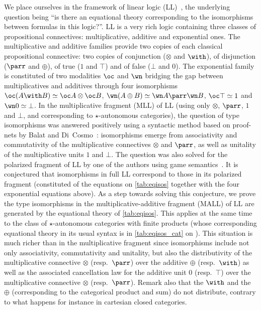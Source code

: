 \documentclass{lmcs}
\newcommand*{\tens}{\otimes} %
\newcommand*{\resp}{resp.}
\newcommand*{\iso}{\mathrel{\simeq}} %
\begin{document}
We place ourselves in the framework of linear logic (LL)~\cite{ll},
the underlying question being ``is there an equational theory corresponding to the isomorphisms between formulas in this logic?''.
LL is a very rich logic containing three classes of propositional connectives: multiplicative, additive and exponential ones.
The multiplicative and additive families provide two copies of each classical propositional connective: two copies of conjunction ($\tens$ and $\with$), of disjunction ($\parr$ and $\oplus$), of true ($1$ and $\top$) and of false ($\bot$ and $0$).
The exponential family is constituted of two modalities $\oc$ and $\wn$ bridging the gap between multiplicatives and additives through four isomorphisms $\oc(A\with B)\iso \oc A\tens\oc B$, $\wn(A\oplus B)\iso \wn A\parr\wn B$, $\oc\top\iso 1$ and $\wn 0\iso\bot$.
In the multiplicative fragment (MLL) of LL (using only $\tens$, $\parr$, $1$ and $\bot$, and corresponding to $\star$-autonomous categories), the question of type isomorphisms was answered positively using a syntactic method based on proof-nets by Balat and Di~Cosmo~\cite{mllisos}: isomorphisms emerge from associativity and commutativity of the multiplicative connectives $\tens$ and $\parr$, as well as unitality of the multiplicative units $1$ and $\bot$.
The question was also solved for the polarized fragment of LL by one of the authors using game semantics~\cite{classisos}.
It is conjectured that isomorphisms in full LL correspond to those in its polarized fragment (constituted of the equations on \autoref{tab:eqisos} together with the four exponential equations above).
As a step towards solving this conjecture, we prove the type isomorphisms in the multiplicative-additive fragment (MALL) of LL are generated by the equational theory of \autoref{tab:eqisos}.
This applies at the same time to the class of $\star$-autonomous categories with finite products (whose corresponding equational theory in its usual syntax is in \autoref{tab:eqisos_cat} on ).
This situation is much richer than in the multiplicative fragment since isomorphisms include not only associativity, commutativity and unitality, but also the distributivity of the multiplicative connective $\tens$ (\resp\ $\parr$) over the additive $\oplus$ (\resp\ $\with$) as well as the associated cancellation law for the additive unit $0$ (\resp\ $\top$) over the multiplicative connective $\tens$ (\resp\ $\parr$).
Remark also that the $\with$ and the $\oplus$ (corresponding to the categorical product and sum) do not distribute, contrary to what happens for instance in cartesian closed categories.
\end{document}
